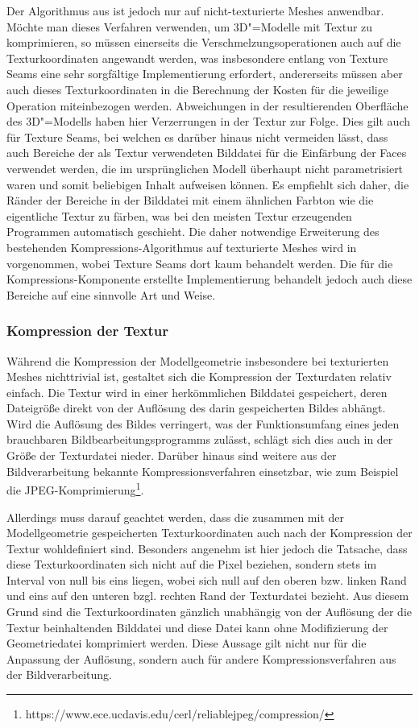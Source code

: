 Der Algorithmus aus \cite{garland1997} ist jedoch nur auf nicht-texturierte Meshes anwendbar. Möchte man dieses Verfahren verwenden, um 3D"=Modelle mit Textur zu komprimieren, so müssen einerseits die Verschmelzungsoperationen auch auf die Texturkoordinaten angewandt werden, was insbesondere entlang von Texture Seams eine sehr sorgfältige Implementierung erfordert, andererseits müssen aber auch dieses Texturkoordinaten in die Berechnung der Kosten für die jeweilige Operation miteinbezogen werden. Abweichungen in der resultierenden Oberfläche des 3D"=Modells haben hier Verzerrungen in der Textur zur Folge. Dies gilt auch für Texture Seams, bei welchen es darüber hinaus nicht vermeiden lässt, dass auch Bereiche der als Textur verwendeten Bilddatei für die Einfärbung der Faces verwendet werden, die im ursprünglichen Modell überhaupt nicht parametrisiert waren und somit beliebigen Inhalt aufweisen können. Es empfiehlt sich daher, die Ränder der Bereiche in der Bilddatei mit einem ähnlichen Farbton wie die eigentliche Textur zu färben, was bei den meisten Textur erzeugenden Programmen automatisch geschieht. Die daher notwendige Erweiterung des bestehenden Kompressions-Algorithmus auf texturierte Meshes wird in \cite{garland1998} vorgenommen, wobei Texture Seams dort kaum behandelt werden. Die für die Kompressions-Komponente erstellte Implementierung behandelt jedoch auch diese Bereiche auf eine sinnvolle Art und Weise.

\subsubsection{Kompression der Textur}

Während die Kompression der Modellgeometrie insbesondere bei texturierten Meshes nichttrivial ist, gestaltet sich die Kompression der Texturdaten relativ einfach. Die Textur wird in einer herkömmlichen Bilddatei gespeichert, deren Dateigröße direkt von der Auflösung des darin gespeicherten Bildes abhängt. Wird die Auflösung des Bildes verringert, was der Funktionsumfang eines jeden brauchbaren Bildbearbeitungsprogramms zulässt, schlägt sich dies auch in der Größe der Texturdatei nieder. Darüber hinaus sind weitere aus der Bildverarbeitung bekannte Kompressionsverfahren einsetzbar, wie zum Beispiel die JPEG-Komprimierung\footnote{https://www.ece.ucdavis.edu/cerl/reliablejpeg/compression/}.

Allerdings muss darauf geachtet werden, dass die zusammen mit der Modellgeometrie gespeicherten Texturkoordinaten auch nach der Kompression der Textur wohldefiniert sind. Besonders angenehm ist hier jedoch die Tatsache, dass diese Texturkoordinaten sich nicht auf die Pixel beziehen, sondern stets im Interval von null bis eins liegen, wobei sich null auf den oberen bzw. linken Rand und eins auf den unteren bzgl. rechten Rand der Texturdatei bezieht. Aus diesem Grund sind die Texturkoordinaten gänzlich unabhängig von der Auflösung der die Textur beinhaltenden Bilddatei und diese Datei kann ohne Modifizierung der Geometriedatei komprimiert werden. Diese Aussage gilt nicht nur für die Anpassung der Auflösung, sondern auch für andere Kompressionsverfahren aus der Bildverarbeitung.

